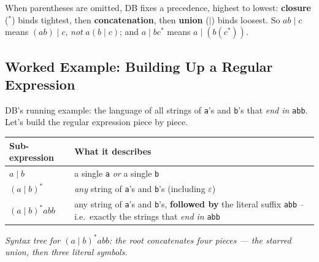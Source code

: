 \documentclass[full-course-notes.tex]{subfiles}
\begin{document}
\begin{coreidea}
When parentheses are omitted, DB fixes a precedence, highest to lowest: \textbf{closure}
($^{*}$) binds tightest, then \textbf{concatenation}, then \textbf{union} ($\mid$) binds
loosest. So $ab \mid c$ means $(ab)\mid c$, \emph{not} $a(b\mid c)$; and $a\mid bc^{*}$ means
$a \mid (b(c^{*}))$.
\end{coreidea}

\subsection{Worked Example: Building Up a Regular Expression}
\label{sec:l4-worked-example-build-up}

DB's running example: the language of all strings of \texttt{a}'s and \texttt{b}'s that
\emph{end in} \texttt{abb}. Let's build the regular expression piece by piece.

\begin{center}
\renewcommand{\arraystretch}{1.3}
\begin{tabularx}{\textwidth}{@{}l X@{}}
\toprule
\textbf{Sub-expression} & \textbf{What it describes} \\
\midrule
$a \mid b$ & a single \texttt{a} \emph{or} a single \texttt{b} \\
$(a \mid b)^{*}$ & \emph{any} string of \texttt{a}'s and \texttt{b}'s (including $\varepsilon$) \\
$(a \mid b)^{*}abb$ & any string of \texttt{a}'s and \texttt{b}'s, \textbf{followed by} the
literal suffix \texttt{abb} -- i.e.\ exactly the strings that \emph{end in} \texttt{abb} \\
\bottomrule
\end{tabularx}
\end{center}

\begin{center}
\end{center}
\begin{center}
\small\textit{Syntax tree for $(a\mid b)^{*}abb$: the root concatenates four pieces --- the
starred union, then three literal symbols.}
\end{center}
\end{document}

